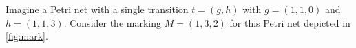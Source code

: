 % 
% 
%    
%
%
%
%
%
%


Imagine a Petri net with a single transition $t=(g,h)$ with $g = (1,1,0)$ and $h = (1,1,3)$. Consider the marking $M=(1,3,2)$ for this Petri net depicted in \autoref{fig:mark}. 

